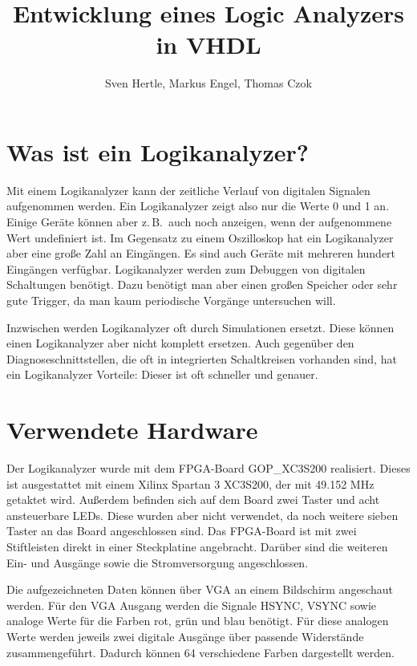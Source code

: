 \documentclass[IN,ngerman,utf8,12pt]{tumbook}
\title{Entwicklung eines Logic Analyzers in VHDL}
\author{Sven Hertle, Markus Engel, Thomas Czok}
\newcommand{\zB}{z.\,B.\ }
\begin{document}
\maketitle%
\tableofcontents%
\clearpage

\chapter{Was ist ein Logikanalyzer?}
Mit einem Logikanalyzer kann der zeitliche Verlauf von digitalen Signalen aufgenommen werden.
Ein Logikanalyzer zeigt also nur die Werte 0 und 1 an.
Einige Geräte können aber \zB auch noch anzeigen, wenn der aufgenommene Wert undefiniert ist.
Im Gegensatz zu einem Oszilloskop hat ein Logikanalyzer aber eine große Zahl an Eingängen.
Es sind auch Geräte mit mehreren hundert Eingängen verfügbar.
Logikanalyzer werden zum Debuggen von digitalen Schaltungen benötigt.
Dazu benötigt man aber einen großen Speicher oder sehr gute Trigger, da man kaum periodische Vorgänge untersuchen will.

Inzwischen werden Logikanalyzer oft durch Simulationen ersetzt.
Diese können einen Logikanalyzer aber nicht komplett ersetzen.
Auch gegenüber den Diagnoseschnittstellen, die oft in integrierten Schaltkreisen vorhanden sind, hat ein Logikanalyzer Vorteile: Dieser ist oft schneller und genauer.

\chapter{Verwendete Hardware}
\label{kap:hardware}
Der Logikanalyzer wurde mit dem FPGA-Board GOP\_XC3S200 realisiert.
Dieses ist ausgestattet mit einem Xilinx Spartan 3 XC3S200, der mit 49.152 MHz getaktet wird.
Außerdem befinden sich auf dem Board zwei Taster und acht ansteuerbare LEDs.
Diese wurden aber nicht verwendet, da noch weitere sieben Taster an das Board angeschlossen sind.
Das FPGA-Board ist mit zwei Stiftleisten direkt in einer Steckplatine angebracht.
Darüber sind die weiteren Ein- und Ausgänge sowie die Stromversorgung angeschlossen.

Die aufgezeichneten Daten können über VGA an einem Bildschirm angeschaut werden.
Für den VGA Ausgang werden die Signale HSYNC, VSYNC sowie analoge Werte für die Farben rot, grün und blau benötigt.
Für diese analogen Werte werden jeweils zwei digitale Ausgänge über passende Widerstände zusammengeführt.
Dadurch können 64 verschiedene Farben dargestellt werden.
\end{document}

